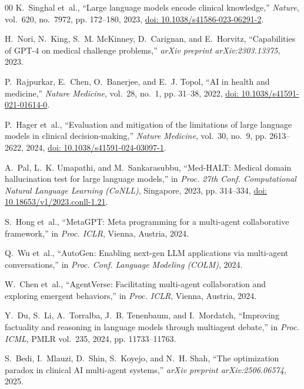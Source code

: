 \documentclass[conference]{IEEEtran}
\begin{document}
\begin{thebibliography}{00}
K.~Singhal et~al., ``Large language models encode clinical knowledge,'' \emph{Nature}, vol.~620, no.~7972, pp. 172--180, 2023, \href{https://doi.org/10.1038/s41586-023-06291-2}{doi: 10.1038/s41586-023-06291-2}.

H.~Nori, N.~King, S.~M. McKinney, D.~Carignan, and E.~Horvitz, ``Capabilities of GPT-4 on medical challenge problems,'' \emph{arXiv preprint arXiv:2303.13375}, 2023.

P.~Rajpurkar, E.~Chen, O.~Banerjee, and E.~J. Topol, ``AI in health and medicine,'' \emph{Nature Medicine}, vol.~28, no.~1, pp. 31--38, 2022, \href{https://doi.org/10.1038/s41591-021-01614-0}{doi: 10.1038/s41591-021-01614-0}.

P.~Hager et~al., ``Evaluation and mitigation of the limitations of large language models in clinical decision-making,'' \emph{Nature Medicine}, vol.~30, no.~9, pp. 2613--2622, 2024, \href{https://doi.org/10.1038/s41591-024-03097-1}{doi: 10.1038/s41591-024-03097-1}.

A.~Pal, L.~K. Umapathi, and M.~Sankarasubbu, ``Med-HALT: Medical domain hallucination test for large language models,'' in \emph{Proc. 27th Conf. Computational Natural Language Learning (CoNLL)}, Singapore, 2023, pp. 314--334, \href{https://doi.org/10.18653/v1/2023.conll-1.21}{doi: 10.18653/v1/2023.conll-1.21}.

S.~Hong et~al., ``MetaGPT: Meta programming for a multi-agent collaborative framework,'' in \emph{Proc. ICLR}, Vienna, Austria, 2024.

Q.~Wu et~al., ``AutoGen: Enabling next-gen LLM applications via multi-agent conversations,'' in \emph{Proc. Conf. Language Modeling (COLM)}, 2024.

W.~Chen et~al., ``AgentVerse: Facilitating multi-agent collaboration and exploring emergent behaviors,'' in \emph{Proc. ICLR}, Vienna, Austria, 2024.

Y.~Du, S.~Li, A.~Torralba, J.~B. Tenenbaum, and I.~Mordatch, ``Improving factuality and reasoning in language models through multiagent debate,'' in \emph{Proc. ICML}, PMLR vol.~235, 2024, pp. 11733--11763.

S.~Bedi, I.~Mlauzi, D.~Shin, S.~Koyejo, and N.~H. Shah, ``The optimization paradox in clinical AI multi-agent systems,'' \emph{arXiv preprint arXiv:2506.06574}, 2025.


\end{thebibliography}
\end{document}
